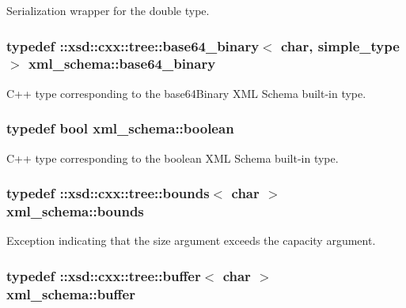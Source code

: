 Serialization wrapper for the double type. 

\hypertarget{namespacexml__schema_a4d35d3537187e95237936654b31ba164}{
\subsubsection[{base64\-\_\-binary}]{\setlength{\rightskip}{0pt plus 5cm}typedef \-::xsd\-::cxx\-::tree\-::base64\-\_\-binary$<$ char, {\bf simple\-\_\-type} $>$ {\bf xml\-\_\-schema\-::base64\-\_\-binary}}}\label{namespacexml__schema_a4d35d3537187e95237936654b31ba164}


C++ type corresponding to the base64\-Binary X\-M\-L Schema built-\/in type. 

\hypertarget{namespacexml__schema_ae5ada4ec9c54b51765c3e4c0e9631bba}{
\subsubsection[{boolean}]{\setlength{\rightskip}{0pt plus 5cm}typedef bool {\bf xml\-\_\-schema\-::boolean}}}\label{namespacexml__schema_ae5ada4ec9c54b51765c3e4c0e9631bba}


C++ type corresponding to the boolean X\-M\-L Schema built-\/in type. 

\hypertarget{namespacexml__schema_a00337f2f08dbcb24280f5cf7b96224ea}{
\subsubsection[{bounds}]{\setlength{\rightskip}{0pt plus 5cm}typedef \-::xsd\-::cxx\-::tree\-::bounds$<$ char $>$ {\bf xml\-\_\-schema\-::bounds}}}\label{namespacexml__schema_a00337f2f08dbcb24280f5cf7b96224ea}


Exception indicating that the size argument exceeds the capacity argument. 

\hypertarget{namespacexml__schema_aff62181c1704f35372302e2acde9b0cc}{
\subsubsection[{buffer}]{\setlength{\rightskip}{0pt plus 5cm}typedef \-::xsd\-::cxx\-::tree\-::buffer$<$ char $>$ {\bf xml\-\_\-schema\-::buffer}}}\label{namespacexml__schema_aff62181c1704f35372302e2acde9b0cc}


